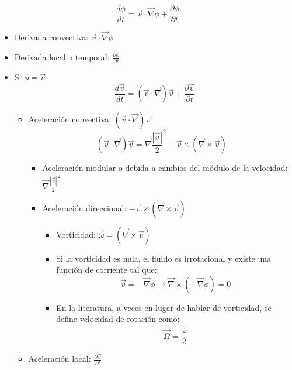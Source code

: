 \[\frac{d\phi}{dt}=\vec{v} \cdot\vec{\nabla}\phi +\frac{\partial \phi}{\partial t} \]
\begin{itemize}
	\item Derivada convectiva: $\vec{v} \cdot\vec{\nabla}\phi$
	\item Derivada local o temporal: $\frac{\partial \phi}{\partial t}$
	\item Si $\phi = \vec{v}$
	\[\frac{d\vec{v}}{dt}=(\vec{v} \cdot\vec{\nabla})\vec{v}+\frac{\partial \vec v}{\partial t} \]
	\begin{itemize}
		\item Aceleración convectiva: $(\vec{v} \cdot\vec{\nabla})\vec{v}$
		\[(\vec{v} \cdot\vec{\nabla})\vec{v}=\vec{\nabla}\frac{|\vec{v}|}{2}^2-\vec{v} \times \left(\vec{\nabla}\times\vec{v}\right)\]
		\begin{itemize}
			\item Aceleración modular o debida a cambios del módulo de la velocidad: $\vec{\nabla}\frac{|\vec{v}|}{2}^2$
			\item Aceleración direccional: $-\vec{v} \times \left(\vec{\nabla}\times\vec{v}\right)$
			\begin{itemize}
				\item Vorticidad: $\vec{\omega}= \left(\vec{\nabla}\times\vec{v}\right)$
			
				\item Si la vorticidad es nula, el fluido es irrotacional y existe una función de corriente tal que:
				\[\vec{v}=-\vec{\nabla}\phi \rightarrow \vec{\nabla}\times\left(-\vec{\nabla}\phi\right)=0\]
				\item  En la literatura, a veces en lugar de hablar de vorticidad, se define velocidad de rotación como:
				\[\vec{\Omega}=\frac{\vec{\omega}}{2}\]
			\end{itemize}
		\end{itemize}
		\item Aceleración local: $\frac{\partial \vec v}{\partial t}$
	\end{itemize}
\end{itemize}
\newpage
